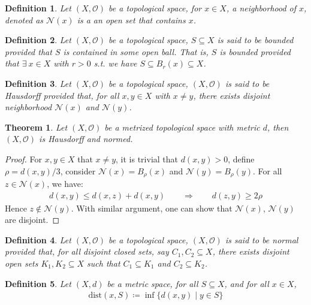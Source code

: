 \documentclass[11pt]{book}
\theoremstyle{break}
\theoremstyle{break}
\newtheorem{thm}{Theorem}[section]
\newtheorem{defn}{Definition}[corL]
\begin{document}
\begin{defn}
Let $(X,\mathcal{O})$ be a topological space, for $x \in X$, a neighborhood of $x$, denoted as $\mathcal{N}(x)$ is a an open set that contains $x$. 
\end{defn}

\begin{defn}
Let $(X, \mathcal{O})$ be a topological space, $S \subseteq X$ is said to be bounded provided that $S$ is contained in some open ball. That is, $S$ is bounded provided that $\exists\ x \in X$ with $r >0$ s.t. we have $S \subseteq B_r(x) \subseteq X$. 
\end{defn}

\begin{defn}
Let $(X,\mathcal{O})$ be a topological space, $(X,\mathcal{O})$ is said to be Hausdorff provided that, for all $x, y \in X$ with $x\neq y$, there exists disjoint neighborhood $\mathcal{N}(x)$ and $\mathcal{N}(y)$. 
\end{defn}

\begin{thm}
Let $(X,\mathcal{O})$ be a metrized topological space with metric $d$, then $(X,\mathcal{O})$ is Hausdorff and normed. 
\end{thm}
\begin{proof}
For $x,y \in X$ that $x\neq y$, it is trivial that $d(x,y) >0$, define $\rho = d(x,y)/3$, consider $\mathcal{N}(x) = B_\rho (x)$ and $\mathcal{N}(y) = B_\rho (y)$. For all $z \in \mathcal{N}(x)$, we have:
\begin{align*}
d(x,y) \leq d(x,z) + d(x,y) \qquad \Rightarrow \qquad d(z,y) \geq 2\rho
\end{align*}
Hence $z \notin \mathcal{N}(y)$. With similar argument, one can show that $\mathcal{N}(x)$, $\mathcal{N}(y)$ are disjoint. 
\end{proof}

\begin{defn}
Let $(X, \mathcal{O})$ be a topological space, $(X, \mathcal{O})$ is said to be normal provided that, for all disjoint closed sets, say $C_1,C_2 \subseteq X$, there exists disjoint open sets $K_1,K_2 \subseteq X$ such that $C_1 \subseteq K_1$ and $C_2 \subseteq K_2$.
\end{defn}

\begin{defn}
Let $(X, d)$ be a metric space, for all $S \subseteq X$, and for all $x \in X$, 
\begin{align*}
\text{dist}(x,S) \coloneqq \inf \{ d(x,y) \mid y \in S\}
\end{align*}
\end{defn}
\end{document}

